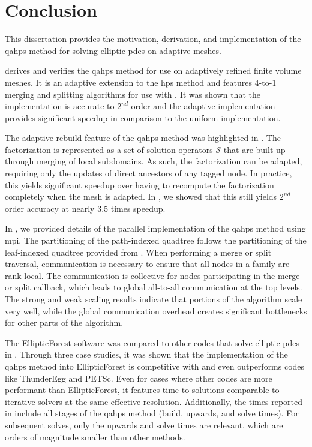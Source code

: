 \section{Conclusion}
\label{sec:conclusion}

This dissertation provides the motivation, derivation, and implementation of the \gls{qahps} method for solving elliptic \gls{pdes} on adaptive meshes.

 derives and verifies the \gls{qahps} method for use on adaptively refined finite volume meshes. It is an adaptive extension to the \gls{hps} method \citep{gillman2014direct} and features 4-to-1 merging and splitting algorithms for use with \pforest \citep{burstedde2011p4est}. It was shown that the implementation is accurate to $2^{nd}$ order and the adaptive implementation provides significant speedup in comparison to the uniform implementation.

The adaptive-rebuild feature of the \gls{qahps} method was highlighted in . The factorization is represented as a set of solution operators $\mathcal{S}$ that are built up through merging of local subdomains. As such, the factorization can be adapted, requiring only the updates of direct ancestors of any tagged node. In practice, this yields significant speedup over having to recompute the factorization completely when the mesh is adapted. In , we showed that this still yields $2^{nd}$ order accuracy at nearly 3.5 times speedup.

In , we provided details of the parallel implementation of the \gls{qahps} method using \gls{mpi}. The partitioning of the path-indexed quadtree follows the partitioning of the leaf-indexed quadtree provided from \pforest. When performing a merge or split traversal, communication is necessary to ensure that all nodes in a family are rank-local. The communication is collective for nodes participating in the merge or split callback, which leads to global all-to-all communication at the top levels. The strong and weak scaling results indicate that portions of the algorithm scale very well, while the global communication overhead creates significant bottlenecks for other parts of the algorithm.

The EllipticForest software was compared to other codes that solve elliptic \gls{pdes} in . Through three case studies, it was shown that the implementation of the \gls{qahps} method into EllipticForest is competitive with and even outperforms codes like ThunderEgg and PETSc. Even for cases where other codes are more performant than EllipticForest, it features time to solutions comparable to iterative solvers at the same effective resolution. Additionally, the times reported in  include all stages of the \gls{qahps} method (build, upwards, and solve times). For subsequent solves, only the upwards and solve times are relevant, which are orders of magnitude smaller than other methods.